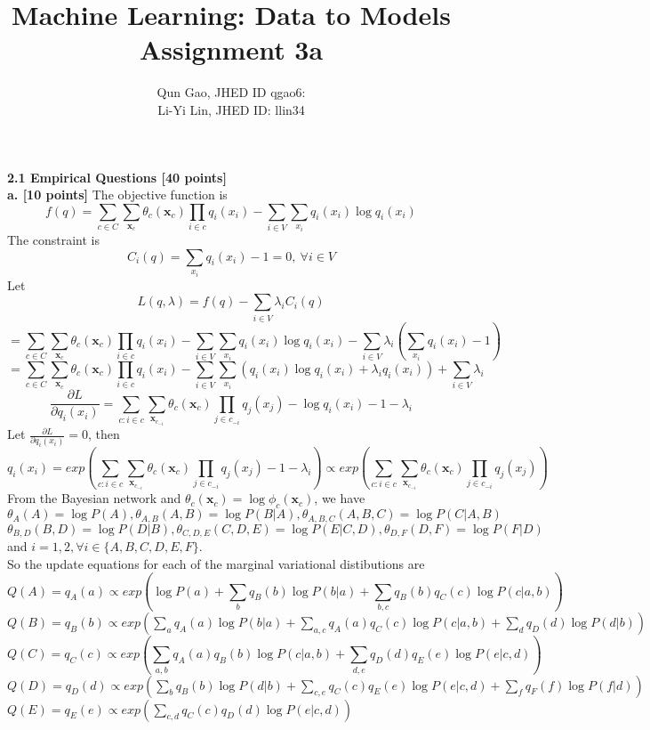 \documentclass[letterpaper, 11pt]{article}
\title{Machine Learning: Data to Models \\Assignment 3a}
\author{Qun Gao, JHED ID qgao6: \\Li-Yi Lin, JHED ID: llin34}
\date{}
\begin{document}
\maketitle
\noindent \Large \textbf{2.1 Empirical Questions [40 points]}\\
\textbf{a. [10 points]}
The objective function is
$$f(q) = \sum_{c \in C} \sum_{\mathbf{x}_c} \theta_c (\mathbf{x}_c) \prod_{i \in c} q_i (x_i)-\sum_{i \in V} \sum_{x_i} q_i (x_i) \log q_i (x_i) $$
The constraint is
$$C_i (q) = \sum_{x_i} q_i (x_i) -1 = 0,~\forall i \in V$$
Let
$$L(q,\lambda) = f(q) - \sum_{i \in V} \lambda_i C_i (q)$$
$$= \sum_{c \in C} \sum_{\mathbf{x}_c} \theta_c (\mathbf{x}_c) \prod_{i \in c} q_i (x_i)-\sum_{i \in V} \sum_{x_i} q_i (x_i) \log q_i (x_i) - \sum_{i \in V} \lambda_i (\sum_{x_i} q_i (x_i) -1)$$
$$= \sum_{c \in C} \sum_{\mathbf{x}_c} \theta_c (\mathbf{x}_c) \prod_{i \in c} q_i (x_i) - \sum_{i \in V} \sum_{x_i} (q_i (x_i) \log q_i (x_i)+\lambda_i q_i (x_i)) + \sum_{i \in V} \lambda_i$$
$$\frac{\partial L}{\partial q_i (x_i)} = \sum_{c:i \in c} \sum_{\mathbf{x}_{c_{-i}}} \theta_{c} (\mathbf{x}_c) \prod_{j \in c_{-i}} q_j (x_j) - \log q_i (x_i) -1 - \lambda_i$$
Let $\frac{\partial L}{\partial q_i (x_i)} = 0$, then
$$q_i (x_i) = exp(\sum_{c:i \in c} \sum_{\mathbf{x}_{c_{-i}}} \theta_{c} (\mathbf{x}_c) \prod_{j \in c_{-i}} q_j (x_j) - 1 - \lambda_i) \propto exp(\sum_{c:i \in c} \sum_{\mathbf{x}_{c_{-i}}} \theta_{c} (\mathbf{x}_c) \prod_{j \in c_{-i}} q_j (x_j))$$
From the Bayesian network and $\theta_c (\mathbf{x}_c) = \log \phi_c (\mathbf{x}_c)$, we have
$$\theta_{A}(A) = \log P(A), \theta_{A,B}(A,B) = \log P(B | A), \theta_{A,B,C}(A,B,C) = \log P(C | A,B)$$
$$\theta_{B,D}(B,D) = \log P(D | B), \theta_{C,D,E}(C,D,E) = \log P(E | C,D), \theta_{D,F}(D,F) = \log P(F | D)$$
and $i = 1,2, \forall i \in \{A,B,C,D,E,F\}$.\\
So the update equations for each of the marginal variational distibutions are
$$Q(A) = q_A (a) \propto exp(\log P(a) + \sum_b q_B (b) \log P(b | a) + \sum_{b,c} q_B (b) q_C (c) \log P(c | a,b) ) $$
$Q(B) = q_B (b) \propto exp( \sum_a q_A (a) \log P(b | a) + \sum_{a,c} q_A(a) q_C(c) \log P(c | a,b) + \sum_d q_D(d) \log P(d | b) )$
$$Q(C) = q_C (c) \propto exp( \sum_{a,b} q_A(a) q_B(b) \log P(c|a,b) + \sum_{d,e} q_D(d) q_E(e) \log P(e|c,d) )$$
$Q(D) = q_D(d) \propto exp( \sum_b q_B(b) \log P(d|b) + \sum_{c,e} q_C(c) q_E(e) \log P(e|c,d) + \sum_f q_F(f) \log P(f|d)  )$\\
$Q(E) = q_E(e) \propto exp( \sum_{c,d} q_C(c) q_D(d) \log P(e|c,d)   )$\\
\end{document}
